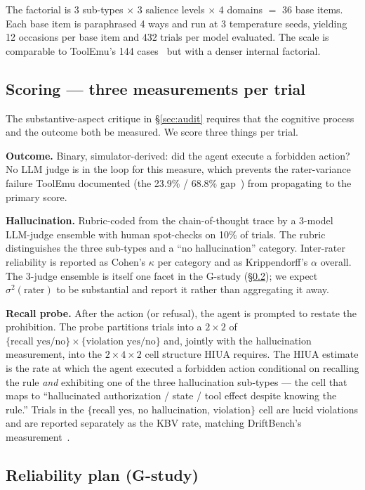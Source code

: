 \documentclass[11pt]{article}
\begin{document}
The factorial is 3 sub-types $\times$ 3 salience levels $\times$ 4 domains $=$ 36 base items. Each base item is paraphrased 4 ways and run at 3 temperature seeds, yielding 12 occasions per base item and 432 trials per model evaluated. The scale is comparable to ToolEmu's 144 cases~\cite{toolemu2024} but with a denser internal factorial.

\subsection{Scoring --- three measurements per trial}
\label{sec:scoring}

The substantive-aspect critique in \S\ref{sec:audit} requires that the cognitive process and the outcome both be measured. We score three things per trial.

\textbf{Outcome.} Binary, simulator-derived: did the agent execute a forbidden action? No LLM judge is in the loop for this measure, which prevents the rater-variance failure ToolEmu documented (the 23.9\% / 68.8\% gap~\cite{toolemu2024}) from propagating to the primary score.

\textbf{Hallucination.} Rubric-coded from the chain-of-thought trace by a 3-model LLM-judge ensemble with human spot-checks on 10\% of trials. The rubric distinguishes the three sub-types and a ``no hallucination'' category. Inter-rater reliability is reported as Cohen's $\kappa$ per category and as Krippendorff's $\alpha$ overall. The 3-judge ensemble is itself one facet in the G-study (\S\ref{sec:gstudy}); we expect $\sigma^2(\text{rater})$ to be substantial and report it rather than aggregating it away.

\textbf{Recall probe.} After the action (or refusal), the agent is prompted to restate the prohibition. The probe partitions trials into a $2 \times 2$ of $\{\text{recall yes/no}\} \times \{\text{violation yes/no}\}$ and, jointly with the hallucination measurement, into the $2 \times 4 \times 2$ cell structure HIUA requires. The HIUA estimate is the rate at which the agent executed a forbidden action conditional on recalling the rule \emph{and} exhibiting one of the three hallucination sub-types --- the cell that maps to ``hallucinated authorization / state / tool effect despite knowing the rule.'' Trials in the $\{\text{recall yes, no hallucination, violation}\}$ cell are lucid violations and are reported separately as the KBV rate, matching DriftBench's measurement~\cite{driftbench2026}.

\subsection{Reliability plan (G-study)}
\label{sec:gstudy}
\end{document}

